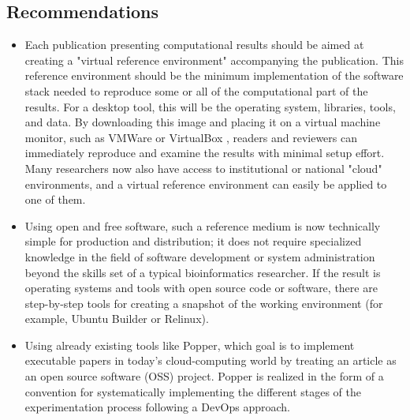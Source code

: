 \subsection{Recommendations}
\begin{itemize}
    \item Each publication presenting computational results should be aimed at creating a "virtual reference environment" accompanying the publication. This reference environment should be the minimum implementation of the software stack needed to reproduce some or all of the computational part of the results. For a desktop tool, this will be the operating system, libraries, tools, and data. By downloading this image and placing it on a virtual machine monitor, such as VMWare \cite{vmware} or VirtualBox \cite{virtualbox}, readers and reviewers can immediately reproduce and examine the results with minimal setup effort. Many researchers now also have access to institutional or national "cloud" environments, and a virtual reference environment can easily be applied to one of them.
    \item Using open and free software, such a reference medium is now technically simple for production and distribution; it does not require specialized knowledge in the field of software development or system administration beyond the skills set of a typical bioinformatics researcher. If the result is operating systems and tools with open source code or software, there are step-by-step tools for creating a snapshot of the working environment (for example, Ubuntu Builder \cite{launchpad} or Relinux).
    \item Using already existing tools like Popper\cite{DBLP:conf/infocom/JimenezAALMMR17}, which goal is to implement executable papers in today's cloud-computing world by treating an article as an open source software (OSS) project. Popper is realized in the form of a convention for systematically implementing the different stages of the experimentation process following a DevOps approach.
\end{itemize}
